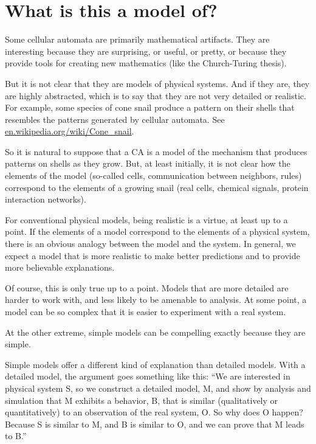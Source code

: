 \documentclass[10pt]{book}
\begin{document}
\section{What is this a model of?}

Some cellular automata are primarily mathematical artifacts.
They are interesting because they are surprising,
or useful, or pretty, or because they provide tools for
creating new mathematics (like the Church-Turing thesis).

But it is not clear that they are models of physical systems.  And if
they are, they are highly abstracted, which is to say that they are
not very detailed or realistic.  For example, some species of cone
snail produce a
pattern on their shells that resembles the patterns generated by
cellular automata.  See \url{en.wikipedia.org/wiki/Cone_snail}.

So it is natural to suppose that a CA is a model of the mechanism that
produces patterns on shells as they grow.  But, at least initially, it
is not clear how the elements of the model (so-called cells,
communication between neighbors, rules) correspond to the elements of
a growing snail (real cells, chemical signals, protein interaction
networks).

For conventional physical models, being realistic is a virtue, at
least up to a point.  If the elements of a model correspond to the
elements of a physical system, there is an obvious analogy between the
model and the system.  In general, we expect a model that is more
realistic to make better predictions and to provide more believable
explanations.

Of course, this is only true up to a point.  Models that are
more detailed are harder to work with, and less likely to be
amenable to analysis.  At some point, a model can be so complex
that it is easier to experiment with a real system.

At the other extreme, simple models can be compelling
exactly because they are simple.

Simple models offer a different kind of explanation than detailed
models.  With a detailed model, the argument goes something
like this: ``We are interested in physical system S, so we
construct a detailed model, M, and show by analysis and simulation
that M exhibits a behavior, B, that is similar (qualitatively
or quantitatively) to an observation of the real system, O.
So why does O happen?  Because S is similar to M, and
B is similar to O, and we can prove that M leads to B.''
\end{document}
